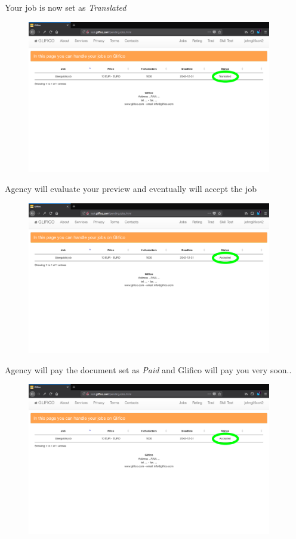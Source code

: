 \documentclass[11 pt, a4paper]{article}
\begin{document}
\clearpage
Your job is now set as \textit{Translated}
\begin{figure}[H]
\centering
\includegraphics[width=0.95\textwidth]{translator_job10.png}
\end{figure}

Agency will evaluate your preview and eventually will accept the job
\begin{figure}[H]
\centering
\includegraphics[width=0.95\textwidth]{translator_job11.png}
\end{figure}

\clearpage
Agency will pay the document set as \textit{Paid} and Glifico will pay you very soon..
\begin{figure}[H]
\centering
\includegraphics[width=0.95\textwidth]{translator_job11.png}
\end{figure}
\end{document}
